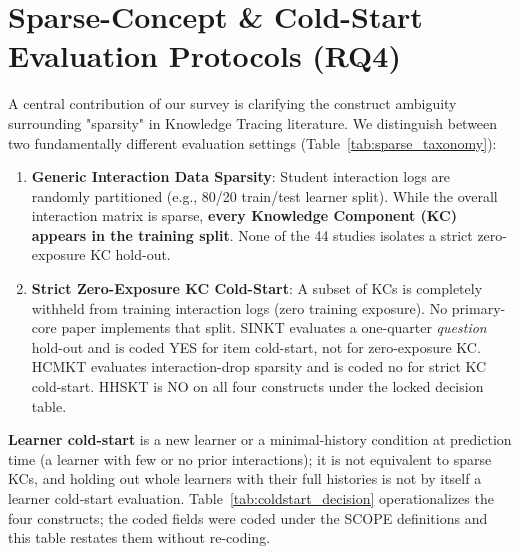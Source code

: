 \documentclass[lettersize,journal]{IEEEtran}
\begin{document}
\section{Sparse-Concept \& Cold-Start Evaluation Protocols (RQ4)}
\label{sec:sparse_coldstart}
A central contribution of our survey is clarifying the construct ambiguity surrounding "sparsity" in Knowledge Tracing literature. We distinguish between two fundamentally different evaluation settings (Table~\ref{tab:sparse_taxonomy}):
\begin{enumerate}
    \item \textbf{Generic Interaction Data Sparsity}: Student interaction logs are randomly partitioned (e.g., 80/20 train/test learner split). While the overall interaction matrix is sparse, \textbf{every Knowledge Component (KC) appears in the training split}. None of the 44 studies isolates a strict zero-exposure KC hold-out.
    \item \textbf{Strict Zero-Exposure KC Cold-Start}: A subset of KCs is completely withheld from training interaction logs (zero training exposure). No primary-core paper implements that split. SINKT \cite{KT044_SINKT_2024} evaluates a one-quarter \emph{question} hold-out and is coded YES for item cold-start, not for zero-exposure KC. HCMKT \cite{HCMKT_2026} evaluates interaction-drop sparsity and is coded no for strict KC cold-start. HHSKT is NO on all four constructs under the locked decision table.
\end{enumerate}
\textbf{Learner cold-start} is a new learner or a minimal-history condition at prediction time (a learner with few or no prior interactions); it is not equivalent to sparse KCs, and holding out whole learners with their full histories is not by itself a learner cold-start evaluation. Table~\ref{tab:coldstart_decision} operationalizes the four constructs; the coded fields were coded under the SCOPE definitions and this table restates them without re-coding.
\end{document}
